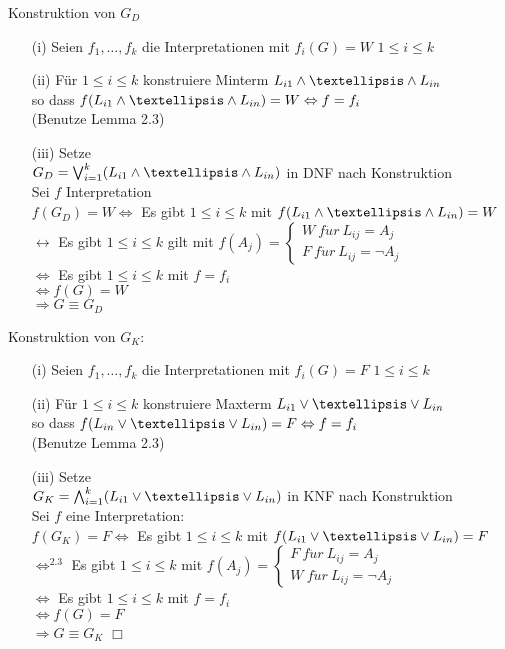 \beweis{}
Konstruktion von $G_D$ 
\begin{enumerate}
\item[(i)] Seien $f_1, …, f_k$ die Interpretationen mit $f_i(G) = W$ \hspace{.5cm} $1 \leq i \leq k$
\item[(ii)] Für $1 \leq i \leq k$ konstruiere Minterm $L_{i1} \AND … \AND L_{in}$\\
so dass $f(L_{i1} \AND … \AND L_{in}) = W \Leftrightarrow f = f_i$\\
(Benutze Lemma 2.3)
\item[(iii)] Setze\\
$G_D = \bigvee_{i=1}^k (L_{i1} \AND … \AND L_{in})$ in DNF nach Konstruktion\\
Sei $f$ Interpretation\\
$f(G_D) = W \Leftrightarrow$ Es gibt $1 \leq i \leq k$ mit $f(L_{i1} \AND … \AND L_{in}) = W$\\
$\leftrightarrow$ Es gibt $1 \leq i \leq k$ gilt mit $f(A_j) = \begin{cases} W\ f\ddot{u}r\ L_{ij}=A_j \\ F\ f\ddot{u}r\ L_{ij}=\neg A_j \end{cases}$\\
$\Leftrightarrow$ Es gibt $1 \leq i \leq k$ mit $f = f_i$\\
$\Leftrightarrow f(G) = W$\\
$\Rightarrow G \equiv G_D$\\
\end{enumerate}
\noindent

Konstruktion von $G_K$:
\begin{enumerate}
\item[(i)] Seien $f_1, …, f_k$ die Interpretationen mit $f_i(G) = F$ \hspace{.5cm} $1 \leq i \leq k$
\item[(ii)] Für $1 \leq i \leq k$ konstruiere Maxterm $L_{i1} \OR … \OR L_{in}$\\
so dass $f(L_{in} \OR … \OR L_{in}) = F \Leftrightarrow f = f_i$\\
(Benutze Lemma 2.3)
\item[(iii)] Setze\\
$G_K = \bigwedge_{i=1}^k ( L_{i1} \OR … \OR L_{in})$ in KNF nach Konstruktion\\
Sei $f$ eine Interpretation:\\
$f(G_K) = F \Leftrightarrow$ Es gibt $1 \leq i \leq k$ mit $f(L_{i1} \OR … \OR L_{in}) = F$\\
$\Leftrightarrow^{2.3}$ Es gibt $1 \leq i \leq k$ mit $f(A_j) = \begin{cases} F\ f\ddot{u}r\ L_{ij}= A_j \\ W\ f\ddot{u}r\ L_{ij}= \neg A_j \end{cases}$\\
$\Leftrightarrow$ Es gibt $1 \leq i \leq k$ mit $f = f_i$\\
$\Leftrightarrow f(G) = F$\\
$\Rightarrow G \equiv G_K$ $\Box$
\end{enumerate}

